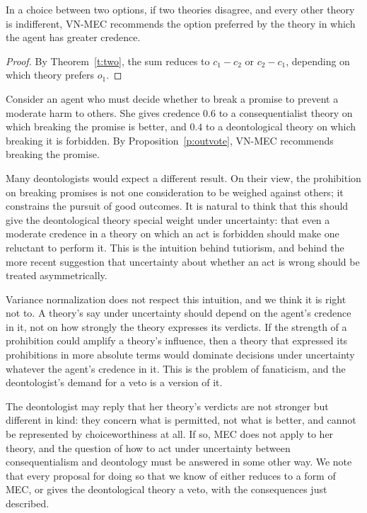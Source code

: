 \documentclass{situationist-preprint}
\begin{document}
\begin{proposition}\label{p:outvote}
In a choice between two options, if two theories disagree, and every other theory is indifferent, VN-MEC recommends the option preferred by the theory in which the agent has greater credence.
\end{proposition}

\begin{proof}
By Theorem~\ref{t:two}, the sum reduces to $c_1 - c_2$ or $c_2 - c_1$, depending on which theory prefers $o_1$.
\end{proof}

Consider an agent who must decide whether to break a promise to prevent a moderate harm to others. She gives credence $0.6$ to a consequentialist theory on which breaking the promise is better, and $0.4$ to a deontological theory on which breaking it is forbidden. By Proposition~\ref{p:outvote}, VN-MEC recommends breaking the promise.

Many deontologists would expect a different result. On their view, the prohibition on breaking promises is not one consideration to be weighed against others; it constrains the pursuit of good outcomes. It is natural to think that this should give the deontological theory special weight under uncertainty: that even a moderate credence in a theory on which an act is forbidden should make one reluctant to perform it. This is the intuition behind tutiorism, and behind the more recent suggestion that uncertainty about whether an act is wrong should be treated asymmetrically.

Variance normalization does not respect this intuition, and we think it is right not to. A theory's say under uncertainty should depend on the agent's credence in it, not on how strongly the theory expresses its verdicts. If the strength of a prohibition could amplify a theory's influence, then a theory that expressed its prohibitions in more absolute terms would dominate decisions under uncertainty whatever the agent's credence in it. This is the problem of fanaticism, and the deontologist's demand for a veto is a version of it.

The deontologist may reply that her theory's verdicts are not stronger but different in kind: they concern what is permitted, not what is better, and cannot be represented by choiceworthiness at all. If so, MEC does not apply to her theory, and the question of how to act under uncertainty between consequentialism and deontology must be answered in some other way. We note that every proposal for doing so that we know of either reduces to a form of MEC, or gives the deontological theory a veto, with the consequences just described.
\end{document}
